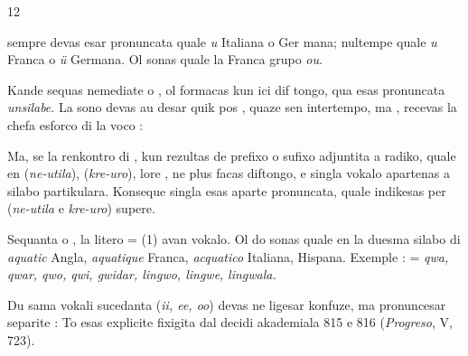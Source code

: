 \begin{VUpage}[16]{12}

 sempre devas esar pronuncata quale \textit{u} Italiana o Ger\cc
mana; nultempe quale \textit{u} Franca o \textit{ü} Germana. Ol sonas\nl
quale la Franca grupo \textit{ou}.

Kande  sequas nemediate  o , ol formacas kun ici dif\cc
tongo, qua esas pronuncata \textit{unsilabe}. La sono  devas au\cc
desar quik pos ,  quaze sen intertempo, ma ,  recevas\nl
la chefa esforco di la voco : 

Ma, se la renkontro di ,  kun  rezultas de prefixo\nl
o sufixo adjuntita a radiko, quale en  (\textit{ne-utila}),\nl
{} (\textit{kre-uro}), lore ,  ne plus facas diftongo, e singla\nl
vokalo apartenas a silabo partikulara. Konseque singla esas\nl
aparte pronuncata, quale indikesas per (\textit{ne-utila} e \textit{kre-uro})\nl
supere.

\VUblancAlinea
Sequanta  o , la litero  =  (1) avan vokalo. Ol do\nl
sonas quale  en la duesma silabo di \textit{aquatic} Angla,\nl
\textit{aquatique} Franca, \textit{acquatico} Italiana, \textit{} Hispana.\nl
Exemple : \cc
{} = \textit{qwa, qwar, qwo, qwi, gwidar, lingwo, lingwe,}\nl
\textit{lingwala.}

Du sama vokali sucedanta (\textit{ii, ee, oo}) devas ne ligesar\nl
konfuze, ma pronuncesar separite : \nl
To esas explicite fixigita dal decidi akademiala 815 e 816\nl
(\textit{Progreso}, V, 723).


\end{VUpage}
